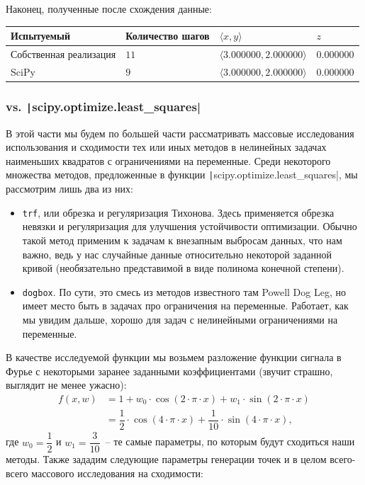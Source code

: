 \documentclass[12pt, a4paper, oneside, final]{article}
\begin{document}
	Наконец, полученные после схождения данные:
	\begin{table}[H]
		\centering
		\begin{tabular}{l|l|l|l}
			Испытуемый & Количество шагов & $\langle x, y \rangle$ & $z$ \\ \hline
			Собственная реализация & $11$ & $\langle 3.000000, 2.000000 \rangle$ & $0.000000$ \\
			SciPy & $9$ & $\langle 3.000000, 2.000000 \rangle$ & $0.000000$
		\end{tabular}
	\end{table}
	\subsubsection*{vs. \texttt|scipy.optimize.least_squares|}
	В этой части мы будем по большей части рассматривать массовые исследования использования и сходимости тех или иных методов в нелинейных задачах наименьших квадратов с ограничениями на переменные.
	Среди некоторого множества методов, предложенные в функции \texttt|scipy.optimize.least_squares|, мы рассмотрим лишь два из них:
	\begin{itemize}
		\item \texttt{trf}, или обрезка и регуляризация Тихонова. Здесь применяется обрезка невязки и регуляризация для улучшения устойчивости оптимизации. Обычно такой метод применим к задачам к внезапным выбросам данных, что нам важно, ведь у нас случайные данные относительно некоторой заданной кривой (необязательно представимой в виде полинома конечной степени).
		\item \texttt{dogbox}. По сути, это смесь из методов известного там Powell Dog Leg, но имеет место быть в задачах про ограничения на переменные. Работает, как мы увидим дальше, хорошо для задач с нелинейными ограничениями на переменные.
	\end{itemize}
	В качестве исследуемой функции мы возьмем разложение функции сигнала в Фурье с некоторыми заранее заданными коэффициентами (звучит страшно, выглядит не менее ужасно):
	\begin{align*}
		f(x, w) &= 1 + w_0 \cdot \cos{(2 \cdot \pi \cdot x)} + w_1 \cdot \sin{(2 \cdot \pi \cdot x)} \\
		&= \dfrac{1}{2} \cdot \cos{(4 \cdot \pi \cdot x)} + \dfrac{1}{10} \cdot \sin{(4 \cdot \pi \cdot x)},
	\end{align*} где $w_0 = \dfrac{1}{2}$ и $w_1 = \dfrac{3}{10}$~-- те самые параметры, по которым будут сходиться наши методы.
	Также зададим следующие параметры генерации точек и в целом всего-всего массового исследования на сходимости:
\end{document}
